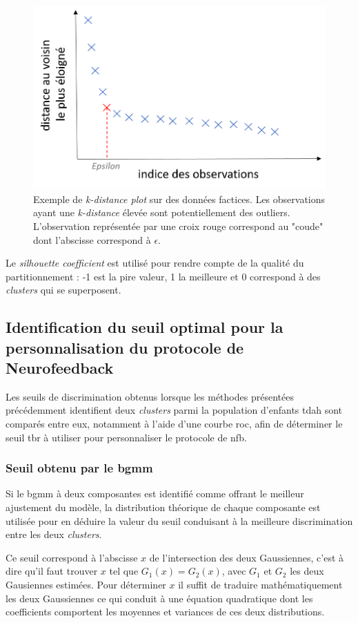 \begin{figure}[h!]
  \centering
	\includegraphics[width=0.7\linewidth]{figures/chapter-4/tbr-k-distance-plot-example} 
  \caption{Exemple de \textit{k-distance plot} sur des données factices. Les observations ayant une \textit{k-distance} élevée sont potentiellement
	des outliers. L'observation représentée par une croix rouge correspond au "coude" dont l'abscisse correspond à $\epsilon$.} 
	\label{Figure:tbr_k_distance_plot_example} 
\end{figure}

Le \textit{silhouette coefficient} est utilisé pour rendre compte de la qualité du partitionnement : -1 est la pire valeur, 1 la meilleure et 0
correspond à des \textit{clusters} qui se superposent.

\subsection{Identification du seuil optimal pour la personnalisation du protocole de Neurofeedback}

Les seuils de discrimination obtenus lorsque les méthodes présentées précédemment identifient deux \textit{clusters} parmi la population d'enfants \gls{tdah} 
sont comparés entre eux, notamment à l'aide d'une courbe \gls{roc}, afin de déterminer le seuil \gls{tbr} à utiliser pour personnaliser le protocole de \gls{nfb}. 

\subsubsection{Seuil obtenu par le \gls{bgmm}}
Si le \gls{bgmm} à deux composantes est identifié comme offrant le meilleur ajustement du modèle, la distribution théorique de chaque composante 
est utilisée pour en déduire la valeur du seuil conduisant à la meilleure discrimination entre les deux \textit{clusters}. 

Ce seuil correspond à l'abscisse $x$ de l'intersection des deux Gaussiennes, c'est à dire qu'il faut trouver $x$ tel que $G_1(x) = G_2(x)$, avec $G_1$ et $G_2$ les deux Gausiennes estimées. 
Pour déterminer $x$ il suffit de traduire mathématiquement les deux Gaussiennes ce qui
conduit à une équation quadratique dont les coefficients comportent les moyennes et variances de ces deux distributions.

